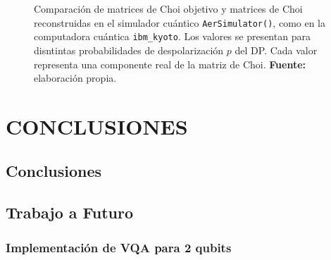 \documentclass[letterpaper,12pt]{thesisECFM}
\theoremstyle{plain}
\theoremstyle{definition}
\theoremstyle{remark}
\newcommand{\1}{\mathbb{1}}
\begin{document}
\begin{figure}[h!]
    \caption[Comparación de matrices de Choi objetivo y reconstruidas]{ 
    Comparación de matrices de Choi objetivo y matrices de Choi reconstruidas en el simulador cuántico \texttt{AerSimulator()}, como en la computadora cuántica \texttt{ibm\_kyoto}. Los valores se presentan para disntintas probabilidades de despolarización $p$ del DP. Cada valor representa una componente real de la matriz de Choi. \textbf{Fuente:} elaboración propia.}
    \label{fig:comparacion_choi}
\end{figure}

\chapter{CONCLUSIONES} %
\section{Conclusiones}
\section{Trabajo a Futuro}
\subsection{Implementación de VQA para 2 qubits}
\appendix



\end{document}
